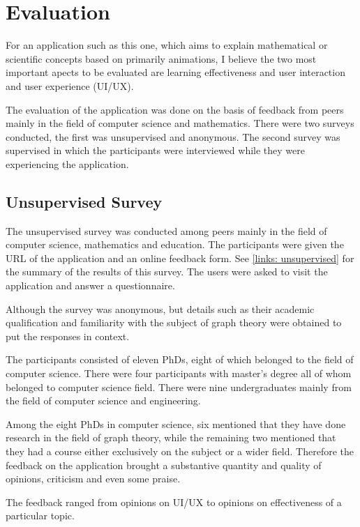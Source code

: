 
\section{Evaluation}

For an application such as this one, which aims to explain mathematical or
scientific concepts based on primarily animations, I believe the two most important apects to be evaluated are learning effectiveness and user interaction and user
experience (UI/UX).


The evaluation of the application was done on the basis of feedback from peers
mainly in the field of computer science and mathematics. There were two surveys
conducted, the first was unsupervised and anonymous. The second survey was
supervised in which the participants were interviewed while they were
experiencing the application.

\subsection{Unsupervised Survey}
The unsupervised survey was conducted among peers mainly in the field of
computer science, mathematics and education. The participants were given the
URL of the application and an online feedback form. See \autoref{links:
unsupervised} for the summary of the results of this survey. The users were asked to visit the application
and answer a questionnaire.

Although the survey was anonymous, but details such as their academic qualification and familiarity with
the subject of graph theory were obtained to put the responses in context.

The participants consisted of eleven PhDs, eight of which belonged to the field
of computer science. There were four participants with master's degree all of
whom belonged to computer science field. There were nine undergraduates mainly
from the field of computer science and engineering.

Among the eight PhDs in computer science, six mentioned that they have done
research in the field of graph theory, while the remaining two mentioned that
they had a course either exclusively on the subject or a wider field.
Therefore the feedback on the application brought a substantive quantity and
quality of opinions, criticism and even some praise.

The feedback ranged from opinions on UI/UX to 
opinions on effectiveness of a particular topic.


